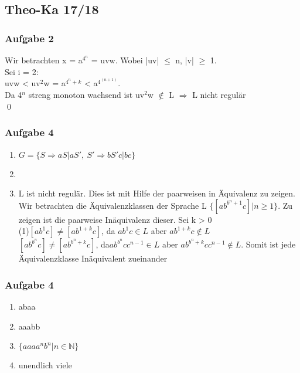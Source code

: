 \documentclass[12pt]{scrartcl}
\begin{document}
\subsection{Theo-Ka 17/18}
	
\subsubsection{Aufgabe 2}
	Wir betrachten x = a$^{4{^n}}$ = uvw. Wobei |uv| $\le$ n, |v| $\ge$ 1. \\
	Sei i = 2:\\
	uvw < uv$^{2}$w = a$^{4^{n}+k}$ <  a$^{4^{(n+1)}}$. \\
	Da 4$^{n}$ streng monoton wachsend ist uv$^{2}$w $\notin$ L $\Rightarrow$ L nicht regulär \\
	\qed

\subsubsection{Aufgabe 4}
	\begin{enumerate}
		\item \(G = \{ S \Rightarrow aS| aS',\ S' \Rightarrow bS'c|bc\}\)
		\item
		\item L ist nicht regulär. Dies ist mit Hilfe der paarweisen in Äquivalenz zu zeigen.\\
		Wir betrachten die Äquivalenzklassen der Sprache L \(\{ [ab^{b^n+1}c]| n \ge 1 \}\). Zu zeigen ist die paarweise Inäquivalenz dieser. Sei k > 0\\
		(1)\( [ab^{1}c] \neq [ab^{1+k}c]\), da \(ab^{1}c \in L\) aber \(ab^{1+k}c \notin L\) \\
		\( [ab^{b^n}c] \neq [ab^{b^n+k}c]\), da\( ab^{b^n}cc^{n-1} \in L\) aber \( ab^{b^n+k}cc^{n-1} \notin L\). Somit ist jede Äquivalenzklasse Inäquivalent zueinander 
	\end{enumerate}
\subsubsection{Aufgabe 4}
	\begin{enumerate}
		\item abaa
		\item aaabb
		\item \(\{aaaa^{n}b^{n}|n\in \mathbb{N}\}\)
		\item unendlich viele 
	\end{enumerate}
\end{document}
